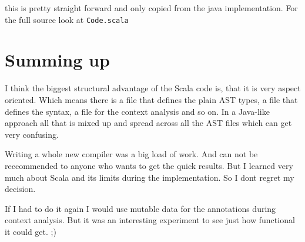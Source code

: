 \documentclass{style}
\begin{document}
this is pretty straight forward and only copied from the java implementation. For the full source look at \texttt{Code.scala}

\section{Summing up}

I think the biggest structural advantage of the Scala code is, that it is very aspect oriented. Which means there is a file that defines the plain AST types, a file that defines the syntax, a file for the context analysis and so on. In a Java-like approach all that is mixed up and spread across all the AST files which can get very confusing.

Writing a whole new compiler was a big load of work. And can not be reccommended to anyone who wants to get the quick results. But I learned very much about Scala and its limits during the implementation. So I dont regret my decision.

If I had to do it again I would use mutable data for the annotations during context analysis. But it was an interesting experiment to see just how functional it could get. ;) 
\end{document}
